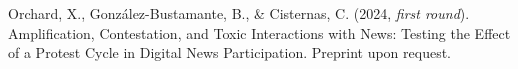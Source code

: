 \begin{publications}
\begin{benumerate}{8}

\item{Orchard, X., González-Bustamante, B., \& Cisternas, C. (2024, {\itshape first round}). Amplification, Contestation, and Toxic Interactions with News: Testing the Effect of a Protest Cycle in Digital News Participation. Preprint upon request.}\vspace{1mm}

\end{benumerate}

\end{publications}

